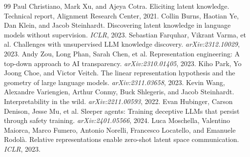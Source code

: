 \documentclass[11pt]{article}
\begin{document}

\begin{thebibliography}{99}
 Paul Christiano, Mark Xu,
  and Ajeya Cotra. Eliciting latent knowledge. Technical report, Alignment
  Research Center, 2021.
 Collin Burns, Haotian Ye, Dan
  Klein, and Jacob Steinhardt. Discovering latent knowledge in language models
  without supervision. \emph{ICLR}, 2023.
 Sebastian Farquhar,
  Vikrant Varma, et al. Challenges with unsupervised LLM knowledge discovery.
  \emph{arXiv:2312.10029}, 2023.
 Andy Zou, Long Phan, Sarah
  Chen, et al. Representation engineering: A top-down approach to AI
  transparency. \emph{arXiv:2310.01405}, 2023.
 Kiho Park, Yo Joong Choe, and Victor
  Veitch. The linear representation hypothesis and the geometry of large language
  models. \emph{arXiv:2311.03658}, 2023.
 Kevin Wang, Alexandre
  Variengien, Arthur Conmy, Buck Shlegeris, and Jacob Steinhardt.
  Interpretability in the wild. \emph{arXiv:2211.00593}, 2022.
 Evan Hubinger, Carson
  Denison, Jesse Mu, et al. Sleeper agents: Training deceptive LLMs that persist
  through safety training. \emph{arXiv:2401.05566}, 2024.
 Luca Moschella, Valentino
  Maiorca, Marco Fumero, Antonio Norelli, Francesco Locatello, and Emanuele
  Rodol\`a. Relative representations enable zero-shot latent space communication.
  \emph{ICLR}, 2023.
\end{thebibliography}
\end{document}
